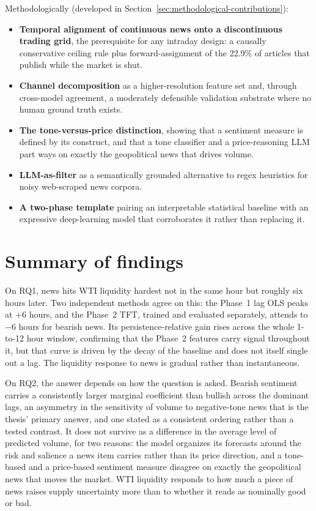 Methodologically (developed in Section~\ref{sec:methodological-contributions}):

\begin{itemize}
  \item \textbf{Temporal alignment of continuous news onto a discontinuous trading grid}, the prerequisite for any intraday design: a causally conservative ceiling rule plus forward-assignment of the 22.9\% of articles that publish while the market is shut.
  \item \textbf{Channel decomposition} as a higher-resolution feature set and, through cross-model agreement, a moderately defensible validation substrate where no human ground truth exists.
  \item \textbf{The tone-versus-price distinction}, showing that a sentiment measure is defined by its construct, and that a tone classifier and a price-reasoning LLM part ways on exactly the geopolitical news that drives volume.
  \item \textbf{LLM-as-filter} as a semantically grounded alternative to regex heuristics for noisy web-scraped news corpora.
  \item \textbf{A two-phase template} pairing an interpretable statistical baseline with an expressive deep-learning model that corroborates it rather than replacing it.
\end{itemize}

\section{Summary of findings}\label{sec:findings-summary}

On RQ1, news hits WTI liquidity hardest not in the same hour but roughly six hours later. Two independent methods agree on this: the Phase~1 lag OLS peaks at $+6$ hours, and the Phase~2 TFT, trained and evaluated separately, attends to $-6$ hours for bearish news. Its persistence-relative gain rises across the whole 1-to-12 hour window, confirming that the Phase~2 features carry signal throughout it, but that curve is driven by the decay of the baseline and does not itself single out a lag. The liquidity response to news is gradual rather than instantaneous.

On RQ2, the answer depends on how the question is asked. Bearish sentiment carries a consistently larger marginal coefficient than bullish across the dominant lags, an asymmetry in the sensitivity of volume to negative-tone news that is the thesis' primary answer, and one stated as a consistent ordering rather than a tested contrast. It does not survive as a difference in the average level of predicted volume, for two reasons: the model organizes its forecasts around the risk and salience a news item carries rather than its price direction, and a tone-based and a price-based sentiment measure disagree on exactly the geopolitical news that moves the market. WTI liquidity responds to how much a piece of news raises supply uncertainty more than to whether it reads as nominally good or bad.

